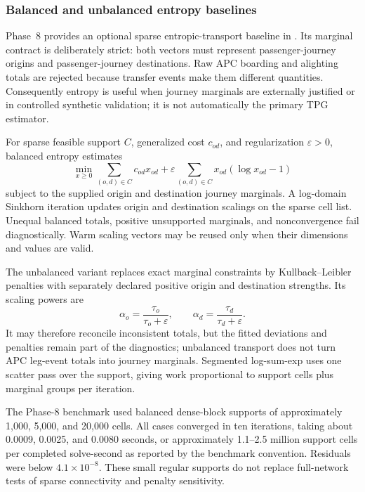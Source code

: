 \subsubsection{Balanced and unbalanced entropy baselines}
\label{sec:reduced-od-entropy}

Phase~8 provides an optional sparse entropic-transport baseline in
.  Its marginal
contract is deliberately strict: both vectors must represent passenger-journey
origins and passenger-journey destinations.  Raw APC boarding and alighting
totals are rejected because transfer events make them different quantities.
Consequently entropy is useful when journey marginals are externally justified
or in controlled synthetic validation; it is not automatically the primary
TPG estimator.

For sparse feasible support $C$, generalized cost $c_{od}$, and regularization
$\varepsilon>0$, balanced entropy estimates
\[
\min_{x\geq0}
\sum_{(o,d)\in C}c_{od}x_{od}
+\varepsilon\sum_{(o,d)\in C}x_{od}(\log x_{od}-1)
\]
subject to the supplied origin and destination journey marginals.  A log-domain
Sinkhorn iteration updates origin and destination scalings on the sparse cell
list.  Unequal balanced totals, positive unsupported marginals, and
nonconvergence fail diagnostically.  Warm scaling vectors may be reused only
when their dimensions and values are valid.

The unbalanced variant replaces exact marginal constraints by Kullback--Leibler
penalties with separately declared positive origin and destination strengths.
Its scaling powers are
\[
\alpha_o=\frac{\tau_o}{\tau_o+\varepsilon},
\qquad
\alpha_d=\frac{\tau_d}{\tau_d+\varepsilon}.
\]
It may therefore reconcile inconsistent totals, but the fitted deviations and
penalties remain part of the diagnostics; unbalanced transport does not turn
APC leg-event totals into journey marginals.  Segmented log-sum-exp uses one
scatter pass over the support, giving work proportional to support cells plus
marginal groups per iteration.

The Phase-8 benchmark used balanced dense-block supports of approximately
1,000, 5,000, and 20,000 cells.  All cases converged in ten iterations, taking
about 0.0009, 0.0025, and 0.0080 seconds, or approximately 1.1--2.5 million
support cells per completed solve-second as reported by the benchmark
convention.  Residuals
were below $4.1\times10^{-8}$.  These small regular supports do not replace
full-network tests of sparse connectivity and penalty sensitivity.

